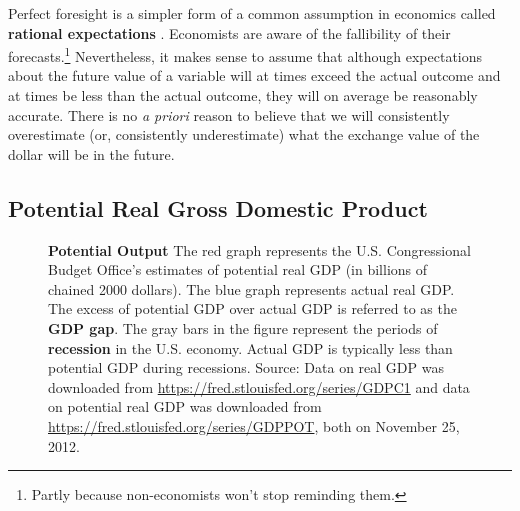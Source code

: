 \documentclass[
  letterpaper,
]{book}
\theoremstyle{plain}
\theoremstyle{remark}
\begin{document}
Perfect foresight is a simpler form of a common assumption in economics
called \textbf{rational expectations}
. Economists are aware of the
fallibility of their forecasts.\footnote{Partly because non-economists
  won't stop reminding them.} Nevertheless, it makes sense to assume
that although expectations about the future value of a variable will at
times exceed the actual outcome and at times be less than the actual
outcome, they will on average be reasonably accurate. There is no
\emph{a priori} reason to believe that we will consistently overestimate
(or, consistently underestimate) what the exchange value of the dollar
will be in the future.

\subsection{Potential Real Gross Domestic Product}\label{sec-pgdp}

\begin{figure}


\caption{\label{fig-chart-pgdp}\textbf{Potential Output} The red graph
represents the U.S. Congressional Budget Office's estimates of potential
real GDP (in billions of chained 2000 dollars). The blue graph
represents actual real GDP. The excess of potential GDP over actual GDP
is referred to as the \textbf{GDP gap}. The gray bars in the figure
represent the periods of \textbf{recession} in the U.S. economy. Actual
GDP is typically less than potential GDP during recessions. Source: Data
on real GDP was downloaded from
\url{https://fred.stlouisfed.org/series/GDPC1} and data on potential
real GDP was downloaded from
\url{https://fred.stlouisfed.org/series/GDPPOT}, both on November 25,
2012.}

\end{figure}%
\end{document}
